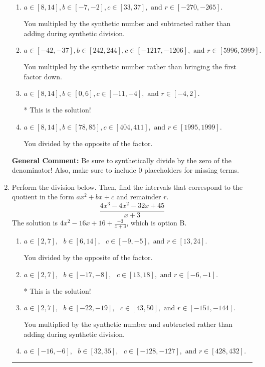 \documentclass{extbook}[14pt]
\newcommand{\litem}[1]{\item #1

\rule{\textwidth}{0.4pt}}
\begin{document}
\begin{enumerate}
{\begin{enumerate}[label=\Alph*.]
 You divided by the opposite of the factor AND multipled the first factor rather than just bringing it down.
\item \( a \in [8, 14], b \in [-7, -2], c \in [33, 37], \text{ and } r \in [-270, -265]. \)

 You multipled by the synthetic number and subtracted rather than adding during synthetic division.
\item \( a \in [-42, -37], b \in [242, 244], c \in [-1217, -1206], \text{ and } r \in [5996, 5999]. \)

 You multipled by the synthetic number rather than bringing the first factor down.
\item \( a \in [8, 14], b \in [0, 6], c \in [-11, -4], \text{ and } r \in [-4, 2]. \)

* This is the solution!
\item \( a \in [8, 14], b \in [78, 85], c \in [404, 411], \text{ and } r \in [1995, 1999]. \)

 You divided by the opposite of the factor.
\end{enumerate}

\textbf{General Comment:} Be sure to synthetically divide by the zero of the denominator! Also, make sure to include 0 placeholders for missing terms.
}
\litem{
Perform the division below. Then, find the intervals that correspond to the quotient in the form $ax^2+bx+c$ and remainder $r$.
\[ \frac{4x^{3} -4 x^{2} -32 x + 45}{x + 3} \]The solution is \( 4x^{2} -16 x + 16 + \frac{-3}{x + 3} \), which is option B.\begin{enumerate}[label=\Alph*.]
\item \( a \in [2, 7], \text{   } b \in [6, 14], \text{   } c \in [-9, -5], \text{   and   } r \in [13, 24]. \)

 You divided by the opposite of the factor.
\item \( a \in [2, 7], \text{   } b \in [-17, -8], \text{   } c \in [13, 18], \text{   and   } r \in [-6, -1]. \)

* This is the solution!
\item \( a \in [2, 7], \text{   } b \in [-22, -19], \text{   } c \in [43, 50], \text{   and   } r \in [-151, -144]. \)

 You multiplied by the synthetic number and subtracted rather than adding during synthetic division.
\item \( a \in [-16, -6], \text{   } b \in [32, 35], \text{   } c \in [-128, -127], \text{   and   } r \in [428, 432]. \)


\end{enumerate}}
\end{enumerate}
\end{document}
